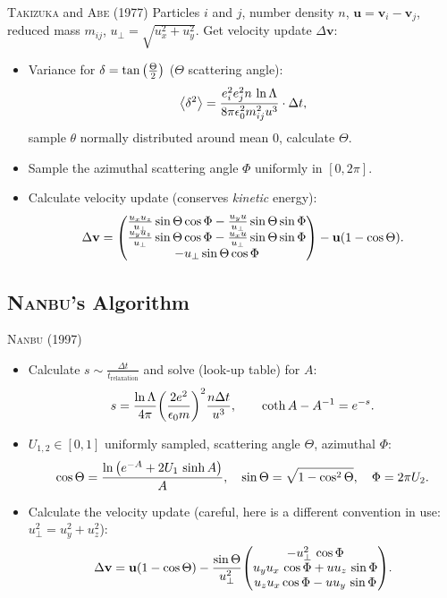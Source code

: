 \begin{frame}{\textsc{Takizuka} and \textsc{Abe} (1977) \cite[4310]{Wang2008}}
    Particles $i$ and $j$, number density $n$, $\mathbf{u} = \mathbf{v}_i - \mathbf{v}_j$, reduced mass $m_{ij}$, $u_\perp = \sqrt{u_x^2 + u_y^2}$. Get velocity update $\Delta \mathbf{v}$:
    \begin{itemize}
        \item Variance for $\delta = \tan\qty(\frac{\Theta}{2})$ ($\Theta$ scattering angle):
        $$
        \expval{\delta^2} = \frac{e_i^2e_j^2n \,\ln\Lambda}{8\pi\epsilon_0^2m_{ij}^2u^3} \cdot \Delta t ,
        $$
        sample $\theta$ normally distributed around mean $0$, calculate $\Theta$.
        \item Sample the azimuthal scattering angle $\Phi$ uniformly in $[0, 2\pi]$.
        \item Calculate velocity update (conserves \textit{kinetic} energy):
        $$
        \Delta \mathbf{v} = \mqty(\frac{u_xu_z}{u_\perp}\sin\Theta\cos\Phi - \frac{u_yu}{u_\perp} \sin\Theta\sin\Phi \\
                                  \frac{u_yu_z}{u_\perp}\sin\Theta\cos\Phi - \frac{u_xu}{u_\perp} \sin\Theta\sin\Phi \\
                                  -u_\perp\sin\Theta\cos\Phi) 
                            - \mathbf{u} \qty(1 - \cos\Theta) .
        $$
    \end{itemize}
\end{frame}


\subsection{\textsc{Nanbu}'s Algorithm}

\begin{frame}{\textsc{Nanbu} (1997) \cite[4644]{Nanbu1997}}
    \begin{itemize}
        \item Calculate $s \sim \frac{\Delta t}{t_\mathrm{relaxation}}$ and solve (look-up table) for $A$:
        $$
        s = \frac{\ln\Lambda}{4\pi} \qty(\frac{2 e^2}{\epsilon_0 m})^2 \frac{n \Delta t}{u^3} , \qquad \coth A - A^{-1} = e^{-s} .
        $$
        \item $U_{1,2} \in [0, 1]$ uniformly sampled, scattering angle $\Theta$, azimuthal $\Phi$:
        $$
        \cos\Theta = \frac{\ln\qty(e^{-A} + 2 U_1 \, \sinh A)}{A}, 
        \quad\sin\Theta = \sqrt{1 - \cos^2\Theta},
        \quad\Phi = 2\pi U_2 .
        $$
        \item Calculate the velocity update (careful, here is a different convention in use: $u_\perp^2 = u_y^2+u_z^2$): 
        $$
        \Delta \mathbf{v} =  \mathbf{u} \qty(1 - \cos\Theta) - \frac{\sin\Theta}{u_\perp^2} \mqty(-u_\perp^2 \, \cos\Phi \\ u_yu_x\,\cos\Phi + uu_z \,\sin\Phi \\ u_zu_x \cos\Phi - uu_y \,\sin\Phi) .
        $$
    \end{itemize}
\end{frame}


